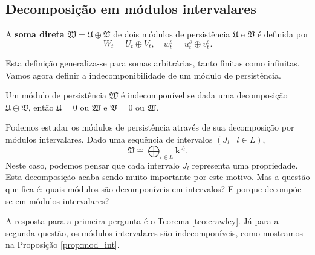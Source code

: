 \subsection{Decomposição em módulos intervalares} 

\begin{defi}
    A \textbf{soma direta} $\mathfrak{W} = \mathfrak{U} \oplus \mathfrak{V}$ de dois módulos
    de persistência $\mathfrak{U}$ e $\mathfrak{V}$ é definida por
    \begin{equation*}
        W_t = U_t \oplus V_t, \quad w^s_t = u_t^s \oplus v^s_t.
    \end{equation*}
\end{defi}
Esta definição generaliza-se para somas arbitrárias, tanto finitas como infinitas. Vamos agora definir
a indecomponibilidade de um módulo de persistência.

\begin{defi}
    Um módulo de persistência $\mathfrak{W}$ é indecomponível se dada uma decomposição $\mathfrak{U}
    \oplus \mathfrak{V}$, então $\mathfrak{U} = 0$ ou $\mathfrak{W}$ e $\mathfrak{V} = 0$ ou $
        \mathfrak{W}$.
\end{defi}

Podemos estudar os módulos de persistência através de sua decomposição por módulos intervalares. Dado
uma sequência de intervalos $(J_l \mid l \in L)$,
\begin{equation*}
    \mathfrak{V} \cong \bigoplus_{l \in L} \mathbf{k}^{J_l}.
\end{equation*}
Neste caso, podemos pensar que cada intervalo $J_l$ representa uma propriedade. Esta decomposição acaba
sendo muito importante por este motivo. Mas a questão que fica é: quais módulos são decomponíveis em 
intervalos? E porque decompõe-se em módulos intervalares? 

A resposta para a primeira pergunta é o Teorema \ref{teo:crawley}. Já para a segunda questão,
os módulos intervalares são indecomponíveis, como mostramos na Proposição \ref{prop:mod_int}.

